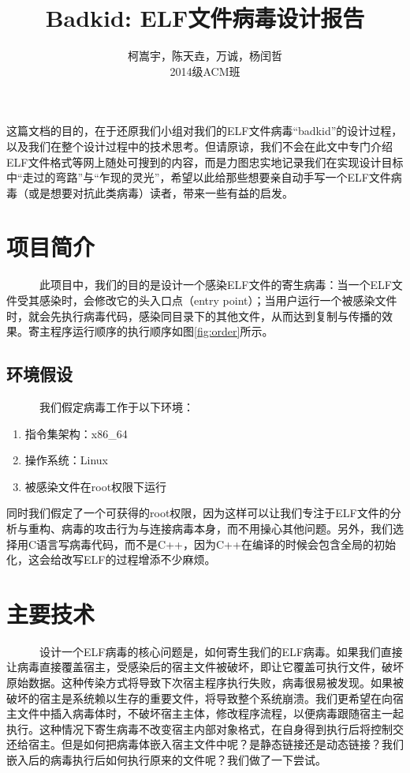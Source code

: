 \documentclass[11pt]{article}
\begin{document}
\title{Badkid: ELF文件病毒设计报告}
\author{柯嵩宇，陈天垚，万诚，杨闰哲\vspace{1em} \\ 2014级ACM班}
\maketitle

这篇文档的目的，在于还原我们小组对我们的ELF文件病毒“badkid”的设计过程，以及我们在整个设计过程中的技术思考。但请原谅，我们不会在此文中专门介绍ELF文件格式等网上随处可搜到的内容，而是力图忠实地记录我们在实现设计目标中“走过的弯路”与“乍现的灵光”，希望以此给那些想要亲自动手写一个ELF文件病毒（或是想要对抗此类病毒）读者，带来一些有益的启发。

\tableofcontents
\newpage
\section{项目简介}
	~~~~~~此项目中，我们的目的是设计一个感染ELF文件的寄生病毒：当一个ELF文件受其感染时，会修改它的头入口点（entry point）；当用户运行一个被感染文件时，就会先执行病毒代码，感染同目录下的其他文件，从而达到复制与传播的效果。寄主程序运行顺序的执行顺序如图\ref{fig:order}所示。
\subsection{环境假设}	
	~~~~~~我们假定病毒工作于以下环境：
	\begin{enumerate}
		\item 指令集架构：x86\_64
		\item 操作系统：Linux
		\item 被感染文件在root权限下运行
	\end{enumerate}
	
	同时我们假定了一个可获得的root权限，因为这样可以让我们专注于ELF文件的分析与重构、病毒的攻击行为与连接病毒本身，而不用操心其他问题。另外，我们选择用C语言写病毒代码，而不是C++，因为C++在编译的时候会包含全局的初始化，这会给改写ELF的过程增添不少麻烦。

\newpage
\section{主要技术}
~~~~~~设计一个ELF病毒的核心问题是，如何寄生我们的ELF病毒。如果我们直接让病毒直接覆盖宿主，受感染后的宿主文件被破坏，即让它覆盖可执行文件，破坏原始数据。这种传染方式将导致下次宿主程序执行失败，病毒很易被发现。如果被破坏的宿主是系统赖以生存的重要文件，将导致整个系统崩溃。我们更希望在向宿主文件中插入病毒体时，不破坏宿主主体，修改程序流程，以便病毒跟随宿主一起执行。这种情况下寄生病毒不改变宿主内部对象格式，在自身得到执行后将控制交还给宿主。但是如何把病毒体嵌入宿主文件中呢？是静态链接还是动态链接？我们嵌入后的病毒执行后如何执行原来的文件呢？我们做了一下尝试。
\end{document}
